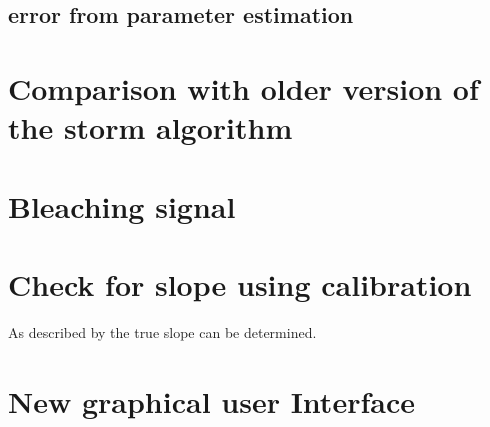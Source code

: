 \subsection{error from parameter estimation}

\section{Comparison with older version of the storm algorithm}
\section{Bleaching signal}

\section{Check for slope using calibration}
As described by \cite{meanVar} the true slope can be determined.

\section{New graphical user Interface}